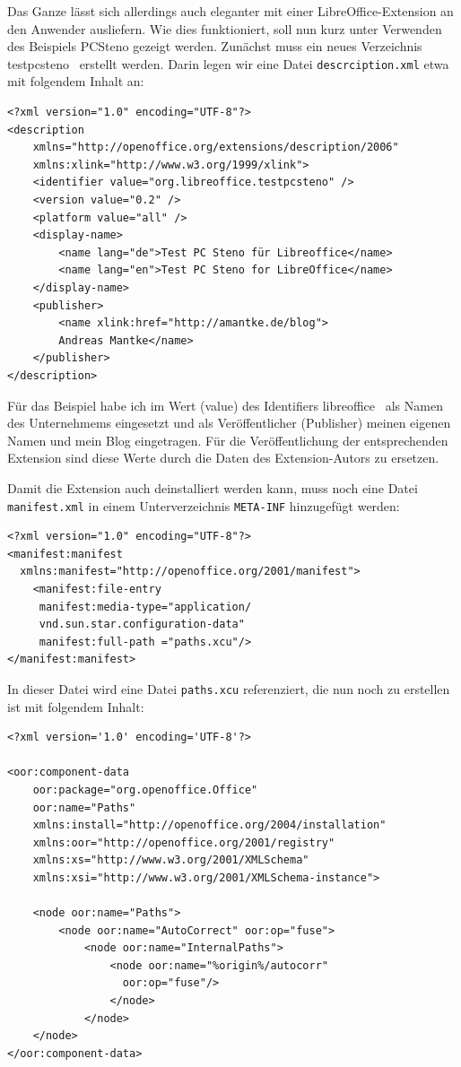 \documentclass[a4paper,10pt,pagesize,titlepage]{scrbook}
\begin{document}
Das Ganze lässt sich allerdings auch eleganter mit einer LibreOffice-Extension an den Anwender ausliefern. Wie dies funktioniert, soll nun kurz unter Verwenden des Beispiels PCSteno gezeigt werden. Zunächst muss ein neues Verzeichnis \glqq testpcsteno\grqq~ erstellt werden. Darin legen wir eine Datei \verb|descrciption.xml| etwa mit folgendem Inhalt an:

\begin{lstlisting}
<?xml version="1.0" encoding="UTF-8"?>
<description
    xmlns="http://openoffice.org/extensions/description/2006"
    xmlns:xlink="http://www.w3.org/1999/xlink">
    <identifier value="org.libreoffice.testpcsteno" />
    <version value="0.2" />
    <platform value="all" />
    <display-name>
        <name lang="de">Test PC Steno für Libreoffice</name>
        <name lang="en">Test PC Steno for LibreOffice</name>
    </display-name>
    <publisher>
        <name xlink:href="http://amantke.de/blog">
        Andreas Mantke</name>
    </publisher>
</description>
\end{lstlisting}

Für das Beispiel habe ich im Wert (value) des Identifiers \glqq libreoffice\grqq~ als Namen des Unternehmems eingesetzt und als Veröffentlicher (Publisher) meinen eigenen Namen und mein Blog eingetragen. Für die Veröffentlichung der entsprechenden Extension sind diese Werte durch die Daten des Extension-Autors zu ersetzen.

Damit die Extension auch deinstalliert werden kann, muss noch eine Datei \verb|manifest.xml| in einem Unterverzeichnis \verb|META-INF| hinzugefügt werden:
\begin{lstlisting}
<?xml version="1.0" encoding="UTF-8"?>
<manifest:manifest 
  xmlns:manifest="http://openoffice.org/2001/manifest">
    <manifest:file-entry
     manifest:media-type="application/
     vnd.sun.star.configuration-data" 
     manifest:full-path ="paths.xcu"/>
</manifest:manifest>
\end{lstlisting}

In dieser Datei wird eine Datei \verb|paths.xcu| referenziert, die nun noch zu erstellen ist mit folgendem Inhalt:

\begin{lstlisting}
<?xml version='1.0' encoding='UTF-8'?>

<oor:component-data 
    oor:package="org.openoffice.Office" 
    oor:name="Paths" 
    xmlns:install="http://openoffice.org/2004/installation" 
    xmlns:oor="http://openoffice.org/2001/registry" 
    xmlns:xs="http://www.w3.org/2001/XMLSchema" 
    xmlns:xsi="http://www.w3.org/2001/XMLSchema-instance">

    <node oor:name="Paths">
        <node oor:name="AutoCorrect" oor:op="fuse">
            <node oor:name="InternalPaths">
                <node oor:name="%origin%/autocorr" 
                  oor:op="fuse"/>
                </node>
            </node>
    </node>
</oor:component-data>
\end{lstlisting}
\end{document}
